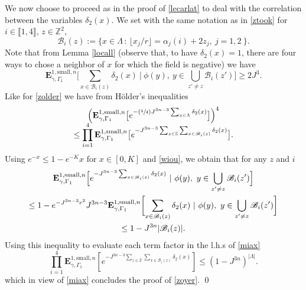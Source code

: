 \documentclass[JEP,XML,SOM,Unicode, NoFloatCountersInSection]{cedram}
\let\mathcal\mathscr
\newcommand{\sep}{\,:\,}
\newcommand{\Psfrac}[2]{(\sfrac{#1}{#2})}
\numberwithin{equation}{section}
\theoremstyle{plain}
\theoremstyle{definition}
\newcommand{\sm}{\mathrm{small}}
\newcommand{\lint}{\llbracket}
\newcommand{\rint}{\rrbracket}
\newcommand{\cB}{{\ensuremath{\mathcal B}} }
\newcommand{\bE}{{\ensuremath{\mathbf E}} }
\newcommand{\bbZ}{{\ensuremath{\mathbb Z}} }
\newcommand{\gG}{\Gamma}
\newcommand{\gL}{\Lambda}
\begin{document}
We now choose to proceed as in the proof of \eqref{lecarlat} to deal with the correlation
between the variables $\delta_2(x)$.
We set with the same notation as in \eqref{ztook} for $i\in \lint 1, 4 \rint$, $z\in \bbZ^2$,
\begin{equation*}%
\cB_i(z):=\{ x\in \gL \sep \lfloor x_j/r \rfloor=\alpha_j(i)+2z_j,\ j=1,2\ \}.
\end{equation*}
Note that from Lemma \ref{locall} (observe that, to have $\delta_2(x)=1$, there are four ways to chose a neighbor of $x$ for which the field is negative) we have
\begin{equation}\label{wiou}
\bE^{1,\sm,n}_{\gamma,\gG_1}\biggl[ \sum_{x\in \cB_i(z)} \delta_2(x) \ | \ \phi(y), \ y \in \bigcup_{z'\ne z}\cB_i(z') \biggr]\ge 2 J^3.
\end{equation}
Like for \eqref{zolder} we have from Hölder's inequalities\vspace*{-3pt}
\begin{multline}\label{miax}
\Bigl(\bE^{1,\sm,n}_{\gamma,\gG_1}\bigl[ e^{ -\Psfrac{1}{4}J^{3n-3} \sum_{x\in \gL}\delta_2(x)} \bigr]\Bigr)^4\\[-5pt]
\le \prod_{i=1}^4 \bE^{1,\sm,n}_{\gamma,\gG_1}\bigl[ e^{-J^{3n-3} \sum_{z\in \bbZ}\sum_{x\in \cB_i(z)} \delta_2(x)} \bigr].
\end{multline}
Using $e^{-x}\le 1-e^{-K}x$ for $x\in[0,K]$ and \eqref{wiou}, we obtain that for any $z$ and $i$\vspace*{-3pt}
\begin{multline*}
\bE^{1,\sm,n}_{\gamma,\gG_1}\Bigl[ e^{-J^{3n-3} \sum_{x\in \cB_i(z)} \delta_2(x)} \ | \ \phi(y), \ y \in \bigcup_{z'\ne z}\cB_i(z') \Bigr]\\
\le 1-e^{-J^{3n-3}r^2}J^{3n-3}\bE^{1,\sm,n}_{\gamma,\gG_1}\biggl[ \sum_{x\in \cB_i(z)} \delta_2(x) \ | \ \phi(y), \ y \in \bigcup_{z'\ne z}\cB_i(z') \biggr]
\\ \le 1- J^{3n}|\cB_i(z)|.
\end{multline*}
Using this inequality to evaluate each term factor in the l.h.s of \eqref{miax}\vspace*{-3pt}
\begin{equation*}
\prod_{i=1}^4 \bE^{1,\sm,n}_{\gamma,\gG_1}\left[ e^{-J^{3n-3} \sum_{z\in \bbZ}\sum_{x\in \cB_i(z)} \delta_2(x)} \right]\le
\left(1-J^{3n}\right)^{|\gL|}.
\end{equation*}
which in view of \eqref{miax} concludes the proof of \eqref{zoyer}. \qed
\end{document}
